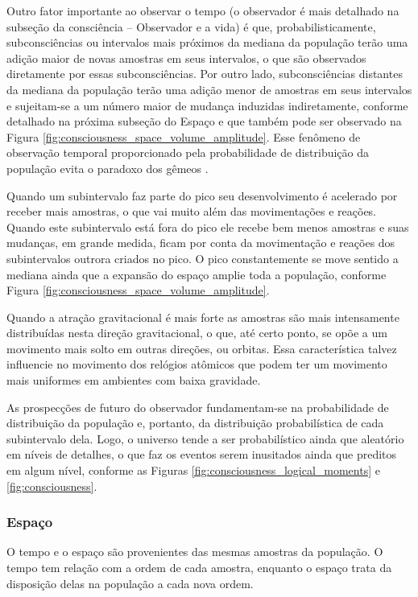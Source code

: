 Outro fator importante ao observar o tempo (o observador é mais detalhado na subseção da consciência – Observador e a vida) é que, probabilisticamente, subconsciências ou intervalos mais próximos da mediana da população terão uma adição maior de novas amostras em seus intervalos, o que são observados diretamente por essas subconsciências. Por outro lado, subconsciências distantes da mediana da população terão uma adição menor de amostras em seus intervalos e sujeitam-se a um número maior de mudança induzidas indiretamente, conforme detalhado na próxima subseção do Espaço e que também pode ser observado na Figura \ref{fig:consciousness_space_volume_amplitude}. Esse fenômeno de observação temporal proporcionado pela probabilidade de distribuição da população evita o paradoxo dos gêmeos \cite{brasilescola_paradoxo_gemeos}.

Quando um subintervalo faz parte do pico seu desenvolvimento é acelerado por receber mais amostras, o que vai muito além das movimentações e reações. Quando este subintervalo está fora do pico ele recebe bem menos amostras e suas mudanças, em grande medida, ficam por conta da movimentação e reações dos subintervalos outrora criados no pico. O pico constantemente se move sentido a mediana ainda que a expansão do espaço amplie toda a população, conforme Figura \ref{fig:consciousness_space_volume_amplitude}.

Quando a atração gravitacional é mais forte as amostras são mais intensamente distribuídas nesta direção gravitacional, o que, até certo ponto, se opõe a um movimento mais solto em outras direções, ou orbitas. Essa característica talvez influencie no movimento dos relógios atômicos que podem ter um movimento mais uniformes em ambientes com baixa gravidade.

As prospecções de futuro do observador fundamentam-se na probabilidade de distribuição da população e, portanto, da distribuição probabilística de cada subintervalo dela. Logo, o universo tende a ser probabilístico ainda que aleatório em níveis de detalhes, o que faz os eventos serem inusitados ainda que preditos em algum nível, conforme as Figuras \ref{fig:consciousness_logical_moments} e \ref{fig:consciousness}. 

\subsubsection{Espaço}
O tempo e o espaço são provenientes das mesmas amostras da população. O tempo tem relação com a ordem de cada amostra, enquanto o espaço trata da disposição delas na população a cada nova ordem. 

